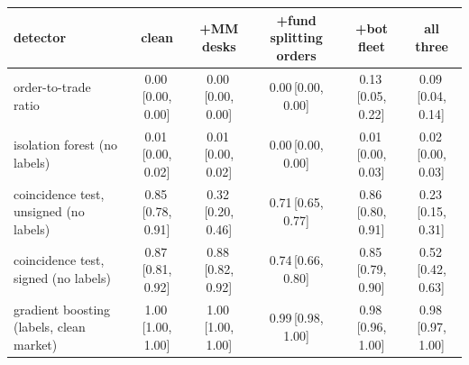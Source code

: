 \begin{tabular}{lccccc}
\toprule
detector & clean & +MM desks & +fund splitting orders & +bot fleet & all three \\
\midrule
order-to-trade ratio & 0.00\,{\scriptsize[0.00, 0.00]} & 0.00\,{\scriptsize[0.00, 0.00]} & 0.00\,{\scriptsize[0.00, 0.00]} & 0.13\,{\scriptsize[0.05, 0.22]} & 0.09\,{\scriptsize[0.04, 0.14]} \\
isolation forest (no labels) & 0.01\,{\scriptsize[0.00, 0.02]} & 0.01\,{\scriptsize[0.00, 0.02]} & 0.00\,{\scriptsize[0.00, 0.00]} & 0.01\,{\scriptsize[0.00, 0.03]} & 0.02\,{\scriptsize[0.00, 0.03]} \\
coincidence test, unsigned (no labels) & 0.85\,{\scriptsize[0.78, 0.91]} & 0.32\,{\scriptsize[0.20, 0.46]} & 0.71\,{\scriptsize[0.65, 0.77]} & 0.86\,{\scriptsize[0.80, 0.91]} & 0.23\,{\scriptsize[0.15, 0.31]} \\
coincidence test, signed (no labels) & 0.87\,{\scriptsize[0.81, 0.92]} & 0.88\,{\scriptsize[0.82, 0.92]} & 0.74\,{\scriptsize[0.66, 0.80]} & 0.85\,{\scriptsize[0.79, 0.90]} & 0.52\,{\scriptsize[0.42, 0.63]} \\
gradient boosting (labels, clean market) & 1.00\,{\scriptsize[1.00, 1.00]} & 1.00\,{\scriptsize[1.00, 1.00]} & 0.99\,{\scriptsize[0.98, 1.00]} & 0.98\,{\scriptsize[0.96, 1.00]} & 0.98\,{\scriptsize[0.97, 1.00]} \\
\bottomrule
\end{tabular}

